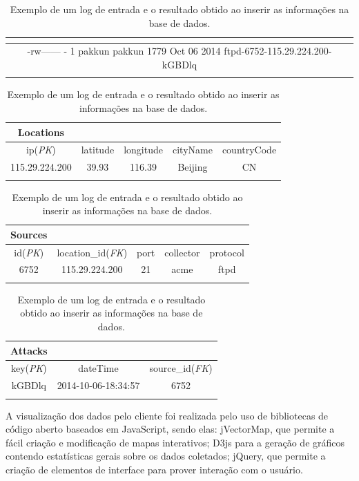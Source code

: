 \documentclass[Portuguese]
{ic-tese-v2}
\begin{document}
\begin{table}
	\caption{Exemplo de um log de entrada e o resultado obtido ao inserir as informações na base de dados.}
	\label{tab:db}
	\begin{tabular}{|c|}
		\multicolumn{1}{c}{}\\
		\hline
		-rw------ - 1 pakkun pakkun  1779 Oct 06  2014 ftpd-6752-115.29.224.200-kGBDlq\\
		\hline	
		\multicolumn{1}{c}{}\\
	\end{tabular}

	\begin{tabular}{|c|c|c|c|c|}
		\cline{1-1}
		\textbf{Locations} & \multicolumn{4}{l}{}\\
		\hline
		ip(\emph{PK}) & latitude & longitude & cityName & countryCode\\
		\hline
		115.29.224.200 & 39.93 & 116.39 & Beijing & CN\\
		\hline
		\multicolumn{5}{c}{}\\
	\end{tabular}

	\begin{tabular}{|c|c|c|c|c|}
		\cline{1-1}
		\textbf{Sources} & \multicolumn{4}{l}{}\\
		\hline
		id(\emph{PK}) & location\_id(\emph{FK}) & port & collector & protocol\\
		\hline
		6752 & 115.29.224.200 & 21 & acme & ftpd\\
		\hline
		\multicolumn{5}{c}{}\\
	\end{tabular}

	\begin{tabular}{|c|c|c|}
		\cline{1-1}
		\textbf{Attacks} & \multicolumn{2}{l}{}\\
		\hline
		key(\emph{PK}) & dateTime 			& source\_id(\emph{FK})\\
		\hline
		kGBDlq 			 & 2014-10-06-18:34:57  & 6752\\
		\hline
		\multicolumn{3}{c}{}\\
	\end{tabular}
\end{table}


A visualização dos dados pelo cliente foi realizada pelo uso de bibliotecas de có́digo aberto baseados em JavaScript, sendo elas: jVectorMap\cite{jvectormap}, que permite a fácil criação e modificação de mapas interativos; D3js para a geração de gráficos contendo estatísticas gerais sobre os dados coletados; jQuery\cite{jquery}, que permite a criação de elementos de interface para prover interação com o usuário.
\end{document}
